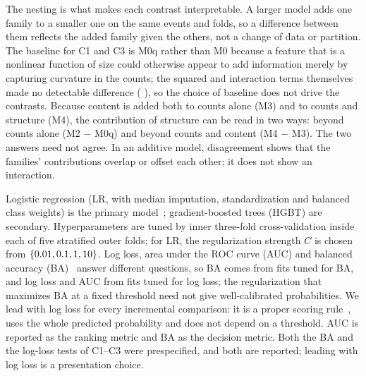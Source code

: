 \documentclass[conference]{IEEEtran}
\begin{document}
The nesting is what makes each contrast interpretable. A larger model adds one family to a smaller one on the same events and folds, so a difference between them reflects the added family given the others, not a change of data or partition. The baseline for C1 and C3 is M0q rather than M0 because a feature that is a nonlinear function of size could otherwise appear to add information merely by capturing curvature in the counts; the squared and interaction terms themselves made no detectable difference (\REFourLL{} \REFourLLCI), so the choice of baseline does not drive the contrasts. Because content is added both to counts alone (M3) and to counts and structure (M4), the contribution of structure can be read in two ways: beyond counts alone (M2 $-$ M0q) and beyond counts and content (M4 $-$ M3). The two answers need not agree. In an additive model, disagreement shows that the families' contributions overlap or offset each other; it does not show an interaction.

Logistic regression (LR, with median imputation, standardization and balanced class weights) is the primary model~\cite{sklearn}; gradient-boosted trees (HGBT) are secondary. Hyperparameters are tuned by inner three-fold cross-validation inside each of five stratified outer folds; for LR, the regularization strength $C$ is chosen from $\{0.01, 0.1, 1, 10\}$. Log loss, area under the ROC curve (AUC) and balanced accuracy (BA)~\cite{brodersen} answer different questions, so BA comes from fits tuned for BA, and log loss and AUC from fits tuned for log loss; the regularization that maximizes BA at a fixed threshold need not give well-calibrated probabilities. We lead with log loss for every incremental comparison: it is a proper scoring rule~\cite{gneiting}, uses the whole predicted probability and does not depend on a threshold. AUC is reported as the ranking metric and BA as the decision metric. Both the BA and the log-loss tests of C1--C3 were prespecified, and both are reported; leading with log loss is a presentation choice.
\end{document}
